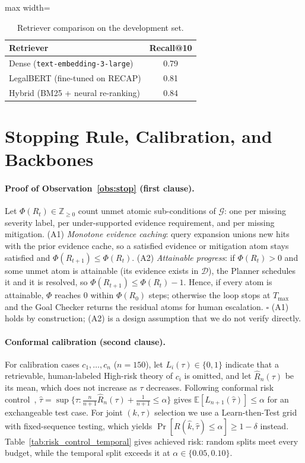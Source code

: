 \begin{table}[h]
\centering
\small
\begin{adjustbox}{max width=\columnwidth}
\begin{tabular}{lc}
\toprule
Retriever & Recall@10 \\
\midrule
Dense (\texttt{text-embedding-3-large}) & 0.79 \\
LegalBERT (fine-tuned on RECAP) & 0.81 \\
Hybrid (BM25 + neural re-ranking) & 0.84 \\
\bottomrule
\end{tabular}
\end{adjustbox}
\caption{Retriever comparison on the development set.}
\label{tab:retriever_ablation}
\end{table}

\section{Stopping Rule, Calibration, and Backbones}
\label{app:theory}

\paragraph{Proof of Observation~\ref{obs:stop} (first clause).}
Let $\Phi(R_t) \in \mathbb{Z}_{\ge 0}$ count unmet atomic sub-conditions of $\mathcal{G}$: one per missing severity label, per under-supported evidence requirement, and per missing mitigation.
(A1) \emph{Monotone evidence caching}: query expansion unions new hits with the prior evidence cache, so a satisfied evidence or mitigation atom stays satisfied and $\Phi(R_{t+1}) \le \Phi(R_t)$.
(A2) \emph{Attainable progress}: if $\Phi(R_t) > 0$ and some unmet atom is attainable (its evidence exists in $\mathcal{D}$), the Planner schedules it and it is resolved, so $\Phi(R_{t+1}) \le \Phi(R_t) - 1$.
Hence, if every atom is attainable, $\Phi$ reaches 0 within $\Phi(R_0)$ steps; otherwise the loop stops at $T_{\max}$ and the Goal Checker returns the residual atoms for human escalation. \hfill$\square$
(A1) holds by construction; (A2) is a design assumption that we do not verify directly.

\paragraph{Conformal calibration (second clause).}
For calibration cases $c_1, \ldots, c_n$ ($n = 150$), let $L_i(\tau) \in \{0, 1\}$ indicate that a retrievable, human-labeled High-risk theory of $c_i$ is omitted, and let $\hat{R}_n(\tau)$ be its mean, which does not increase as $\tau$ decreases.
Following conformal risk control~\citep{angelopoulos2023conformalrisk}, $\hat{\tau} = \sup\{\tau : \frac{n}{n+1}\hat{R}_n(\tau) + \frac{1}{n+1} \le \alpha\}$ gives $\mathbb{E}[L_{n+1}(\hat{\tau})] \le \alpha$ for an exchangeable test case.
For joint $(k, \tau)$ selection we use a Learn-then-Test grid~\citep{angelopoulos2021ltt} with fixed-sequence testing, which yields $\Pr[R(\hat{k}, \hat{\tau}) \le \alpha] \ge 1 - \delta$ instead.
Table~\ref{tab:risk_control_temporal} gives achieved risk: random splits meet every budget, while the temporal split exceeds it at $\alpha \in \{0.05, 0.10\}$.

